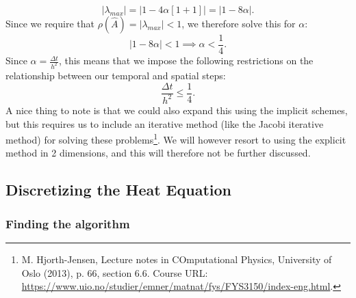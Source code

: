 \documentclass[reprint,english,notitlepage]{revtex4-1}  %
\begin{document}
\begin{equation}
    |\lambda_{max}| = |1-4\alpha[1+1]| = |1-8\alpha|.
\end{equation}
Since we require that $\rho(\hat{A}) = |\lambda_{max}| < 1$, we therefore solve this for $\alpha$:
\begin{equation}\label{eq:thefinal}
    |1-8\alpha| < 1 \implies \alpha < \frac{1}{4}.
\end{equation}
Since $\alpha = \frac{\Delta t}{h^2}$, this means that we impose the following restrictions on the relationship between our temporal and spatial steps:
\begin{equation}
    \frac{\Delta t}{h^2} \leq \frac{1}{4}.
\end{equation}
A nice thing to note is that we could also expand this using the implicit schemes, but this requires us to include an iterative method (like the Jacobi iterative method) for solving these problems\footnote{M. Hjorth-Jensen, Lecture notes in COmputational Physics, University of Oslo (2013), p. 66, section 6.6. Course URL: \url{https://www.uio.no/studier/emner/matnat/fys/FYS3150/index-eng.html}.}. We will however resort to using the explicit method in 2 dimensions, and this will therefore not be further discussed.

\subsection{Discretizing the Heat Equation}

\subsubsection{Finding the algorithm}
\end{document}
